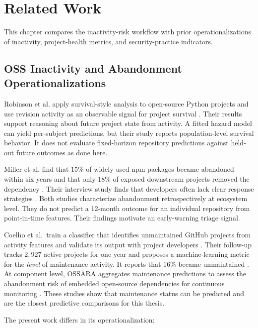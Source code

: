 \chapter{Related Work}
\label{chap:related-work}

This chapter compares the inactivity-risk workflow with prior operationalizations
of inactivity, project-health metrics, and security-practice indicators.

\section{OSS Inactivity and Abandonment Operationalizations}
\label{sec:related-inactivity}

Robinson et al. apply survival-style analysis to open-source Python projects and
use revision activity as an observable signal for project survival
\cite{robinson2022survival}. Their results support reasoning about future project
state from activity. A fitted hazard model can yield per-subject predictions, but
their study reports population-level survival behavior. It does not evaluate
fixed-horizon repository predictions against held-out future outcomes as done
here.

Miller et al. find that \(15\%\) of widely used npm packages became abandoned
within six years and that only \(18\%\) of exposed downstream projects removed
the dependency \cite{miller2025abandonment}. Their
interview study finds that developers often lack clear response strategies
\cite{miller2023wingingit}. Both studies characterize abandonment
retrospectively at ecosystem level. They do not predict a 12-month outcome for an
individual repository from point-in-time features. Their findings motivate an
early-warning triage signal.

Coelho et al.\ train a classifier that identifies unmaintained GitHub projects
from activity features and validate its output with project developers
\cite{coelho2018identifying}. Their follow-up tracks \(2{,}927\) active projects
for one year and proposes a machine-learning metric for the \emph{level} of
maintenance activity. It reports that \(16\%\) became unmaintained
\cite{coelho2020maintained}. At component level, OSSARA aggregates maintenance
predictions to assess the abandonment risk of embedded open-source dependencies
for continuous monitoring \cite{li2022ossara}. These studies show that
maintenance status can be predicted and are the closest predictive comparisons
for this thesis.

The present work differs in its operationalization:

